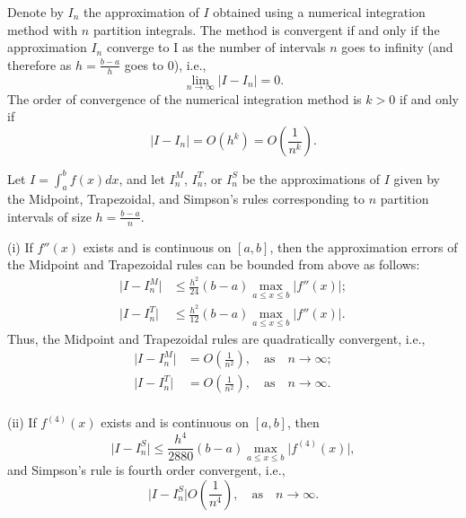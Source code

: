\begin{definition}
    Denote by $ I_n $ the approximation of $ I $ obtained using a numerical
        integration method with $ n $ partition integrals.
    The method is convergent if and only if the approximation $ I_n $ converge
        to I as the number of intervals $ n $ goes to infinity (and therefore
        as $ h = \frac{b - a}{h} $ goes to 0), i.e.,
    \begin{equation*}
        \lim_{n \rightarrow \infty} \lvert I - I_n \rvert = 0.
    \end{equation*}
    The order of convergence of the numerical integration method is $ k > 0 $
        if and only if
    \begin{equation*}
        \lvert I - I_n \rvert = O(h^k) = O \left( \frac{1}{n^k} \right).
    \end{equation*}
\end{definition}

\begin{theorem}
    Let $ I = \int_{a}^{b} f(x) dx $, and let $ I_n^M $, $ I_n^T $, or
        $ I_n^S $ be the approximations of $ I $ given by the Midpoint,
        Trapezoidal, and Simpson's rules corresponding to $ n $ partition
        intervals of size $ h = \frac{b - a}{n} $.

    (i) If $ f''(x) $ exists and is continuous on $ [a, b] $, then the
        approximation errors of the Midpoint and Trapezoidal rules can be
        bounded from above as follows:
    \begin{align}
        \lvert I - I_n^M \rvert &\leq \frac{h^2}{24} (b - a)
            \max_{a \leq x \leq b} \lvert f''(x) \rvert;
            \label{eq:midpoint-rule-upper-bound} \\
        \lvert I - I_n^T \rvert &\leq \frac{h^2}{12} (b - a)
            \max_{a \leq x \leq b} \lvert f''(x) \rvert.
            \label{eq:trapezoidal-rule-upper-bound}
    \end{align}
    Thus, the Midpoint and Trapezoidal rules are quadratically convergent, i.e.,
    \begin{align}
        \lvert I - I_n^M \rvert &= O \left( \frac{1}{n^2} \right), \quad
            \text{as}\quad n \rightarrow \infty; \\
        \lvert I - I_n^T \rvert &= O \left( \frac{1}{n^2} \right), \quad
            \text{as}\quad n \rightarrow \infty. \\
    \end{align}

    (ii) If $ f^{(4)}(x) $ exists and is continuous on $ [a, b] $, then
    \begin{equation}
        \lvert I - I_n^S \rvert \leq \frac{h^4}{2880} (b - a)
            \max_{a \leq x \leq b} \lvert f^{(4)}(x) \rvert,
        \label{eq:simpsons-rule-upper-bound}
    \end{equation}
    and Simpson's rule is fourth order convergent, i.e.,
    \begin{equation}
        \lvert I - I_n^S \rvert  O \left( \frac{1}{n^4} \right), \quad
            \text{as}\quad n \rightarrow \infty.
    \end{equation}
\end{theorem}

